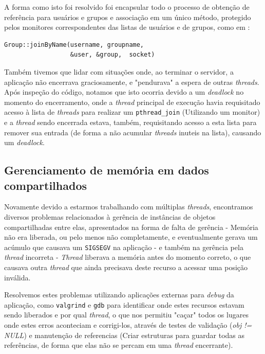 \documentclass{article}
\begin{document}
A forma como isto foi resolvido foi encapsular todo o processo de obtenção de referência para usuários e grupos e associação em um único método, protegido pelos monitores correspondentes das listas de usuários e de grupos, como em :
\begin{lstlisting}
Group::joinByName(username, groupname, 
                  &user, &group,  socket)
\end{lstlisting}
\par Também tivemos que lidar com situações onde, ao terminar o servidor, a aplicação não encerrava graciosamente, e "pendurava" a espera de outras \textit{threads}. Após inspeção do código, notamos que isto ocorria devido a um \textit{deadlock} no momento do encerramento, onde a \textit{thread} principal de execução havia requisitado acesso à lista de \textit{threads} para realizar um \texttt{pthread\_join} (Utilizando um monitor) e a \textit{thread} sendo encerrada estava, também, requisitando acesso a esta lista para remover sua entrada  (de forma a não acumular \textit{threads} inuteis na lista), causando um \textit{deadlock}.
\subsection{Gerenciamento de memória em dados compartilhados}
\par Novamente devido a estarmos trabalhando com múltiplas \textit{threads}, encontramos diversos problemas relacionados à gerência de instâncias de objetos compartilhadas entre elas, apresentados na forma de falta de gerência - Memória não era liberada, ou pelo menos não completamente, e eventualmente gerava um acúmulo que causava um \texttt{SIGSEGV} na aplicação - e também na gerência pela \textit{thread} incorreta - \textit{Thread} liberava a memória antes do momento correto, o que causava outra \textit{thread} que ainda precisava deste recurso a acessar uma posição inválida.
\par Resolvemos estes problemas utilizando aplicações externas para \textit{debug} da aplicação, como \texttt{valgrind} e \texttt{gdb} para identificar onde estes recursos estavam sendo liberados e por qual \textit{thread}, o que nos permitiu "caçar" todos os lugares onde estes erros aconteciam e corrigi-los, através de testes de validação (\textit{obj != NULL}) e manutenção de referencias (Criar estruturas para guardar todas as referências, de forma que elas não se percam em uma \textit{thread} encerrante).
\end{document}
